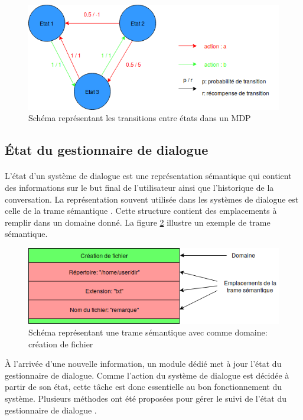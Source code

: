 \begin{figure}[H]
	\centering
	\includegraphics[width=.8\linewidth]{images/DM/MDP.png} 
	\caption{Schéma représentant les transitions entre états dans un MDP}\label{MDPfig}
\end{figure}


\subsection{État du gestionnaire de dialogue}\label{trame}
\paragraph{}
L'état d'un système de dialogue est une représentation sémantique qui contient des informations sur le but final de l'utilisateur ainsi que l'historique de la conversation. La représentation souvent utilisée dans les systèmes de dialogue est celle de la trame sémantique \citep{Chen2017}. Cette structure contient des emplacements à remplir dans un domaine donné. La figure \ref{SFrame} illustre un exemple de trame sémantique.\newline
\begin{figure}[H]
	\centering
	\includegraphics[width=.7\linewidth]{images/DM/SFrame.png} 
	\caption{Schéma représentant une trame sémantique avec comme domaine: création de fichier} 
	\label{SFrame}
\end{figure}


\par À l'arrivée d'une nouvelle information, un module dédié met à jour l'état du gestionnaire de dialogue. Comme l'action du système de dialogue est décidée à partir de son état, cette tâche est donc essentielle au bon fonctionnement du système. Plusieurs méthodes ont été proposées pour gérer le suivi de l'état du gestionnaire de dialogue \citep{Williams2007}.
